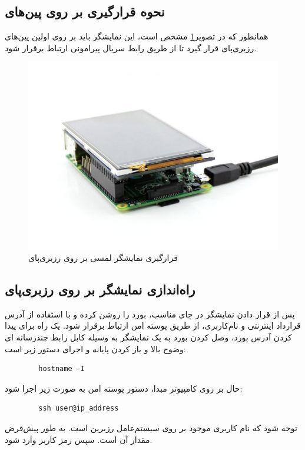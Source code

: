 \subsection{نحوه قرارگیری بر روی پین‌های }
همانطور که در تصویر\ref{spi} مشخص است، این نمایشگر باید بر روی اولین پین‌های  رزبری‌پای قرار گیرد تا از طریق رابط سریال پیرامونی ارتباط برقرار شود.
\begin{figure}[t!]
    \centering
    \includegraphics[scale=0.5]{figures/spi.jpg}
    \caption{قرارگیری نمایشگر لمسی بر روی رزبری‌پای }
    \label{spi}
\end{figure}

\subsection{راه‌اندازی نمایشگر بر روی رزبری‌پای}
پس از قرار دادن نمایشگر در جای مناسب، بورد را روشن کرده و با استفاده از آدرس  قرارداد اینترنتی و نام‌کاربری، از طریق پوسته امن ارتباط برقرار شود.
یک راه برای پیدا کردن آدرس بورد، وصل کردن بورد به یک نمایشگر به وسیله کابل رابط چندرسانه ای وضوح بالا و باز کردن پایانه و اجرای دستور زیر است:
\begin{latin}
    \begin{lstlisting}
        hostname -I
    \end{lstlisting}
\end{latin}

حال بر روی کامپیوتر مبدا، دستور پوسته امن به صورت زیر اجرا شود:
\begin{latin}
    \begin{lstlisting}
        ssh user@ip_address
    \end{lstlisting}
\end{latin}
توجه شود که  نام کاربری موجود بر روی سیستم‌عامل رزبرین است. به طور پیش‌فرض مقدار آن  است. سپس رمز کاربر وارد شود.


